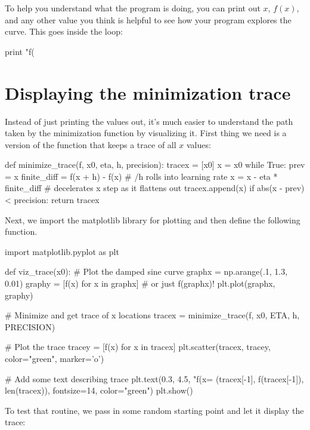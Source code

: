\documentclass[titlepage]{tufte-book}
\begin{document}
\begin{fullwidth}
To help you understand what the program is doing, you can print out $x$, $f(x)$, and any other value you think is helpful to see how your program explores the curve. This goes inside the loop:

\begin{pyverbatim}
print "f(%
\end{pyverbatim}

\section{Displaying the minimization trace}

Instead of just printing the values out, it's much easier to understand the path taken by the minimization function by visualizing it. First thing we need is a version of the function that keeps a trace of all $x$ values:

\begin{pyverbatim}
def minimize_trace(f, x0, eta, h, precision):
    tracex = [x0]
    x = x0
    while True:
        prev = x
        finite_diff = f(x + h) - f(x)  # /h rolls into learning rate
        x = x - eta * finite_diff  # decelerates x step as it flattens out
        tracex.append(x)
        if abs(x - prev) < precision:
            return tracex
\end{pyverbatim}

Next, we import the matplotlib library for plotting and then define the following function.

\begin{pyverbatim}
import matplotlib.pyplot as plt

def viz_trace(x0):
    # Plot the damped sine curve
    graphx = np.arange(.1, 1.3, 0.01)
    graphy = [f(x) for x in graphx] # or just f(graphx)!
    plt.plot(graphx, graphy)

    # Minimize and get trace of x locations
    tracex = minimize_trace(f, x0, ETA, h, PRECISION)

    # Plot the trace
    tracey = [f(x) for x in tracex]
    plt.scatter(tracex, tracey, color="green", marker='o')
    
    # Add some text describing trace
    plt.text(0.3, 4.5, "f(x=%
             (tracex[-1], f(tracex[-1]), len(tracex)), fontsize=14,
             color="green")
    plt.show()
\end{pyverbatim}

\noindent To test that routine, we pass in some random starting point and let it display the trace:


\end{fullwidth}
\end{document}
